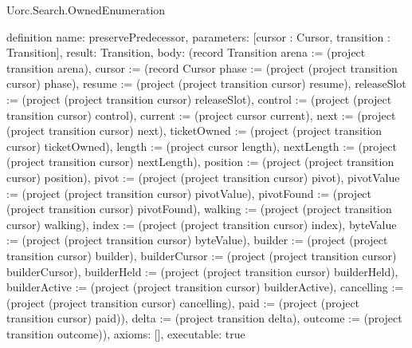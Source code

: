 \begin{lexlean}{Uorc.Search.OwnedEnumeration}
\begin{semanticmodule}
definition{
  name: preservePredecessor,
  parameters: [cursor : Cursor, transition : Transition],
  result: Transition,
  body: (record Transition {arena := (project transition arena), cursor := (record Cursor {phase := (project (project transition cursor) phase), resume := (project (project transition cursor) resume), releaseSlot := (project (project transition cursor) releaseSlot), control := (project (project transition cursor) control), current := (project cursor current), next := (project (project transition cursor) next), ticketOwned := (project (project transition cursor) ticketOwned), length := (project cursor length), nextLength := (project (project transition cursor) nextLength), position := (project (project transition cursor) position), pivot := (project (project transition cursor) pivot), pivotValue := (project (project transition cursor) pivotValue), pivotFound := (project (project transition cursor) pivotFound), walking := (project (project transition cursor) walking), index := (project (project transition cursor) index), byteValue := (project (project transition cursor) byteValue), builder := (project (project transition cursor) builder), builderCursor := (project (project transition cursor) builderCursor), builderHeld := (project (project transition cursor) builderHeld), builderActive := (project (project transition cursor) builderActive), cancelling := (project (project transition cursor) cancelling), paid := (project (project transition cursor) paid)}), delta := (project transition delta), outcome := (project transition outcome)}),
  axioms: [],
  executable: true
}


\end{semanticmodule}
\end{lexlean}
